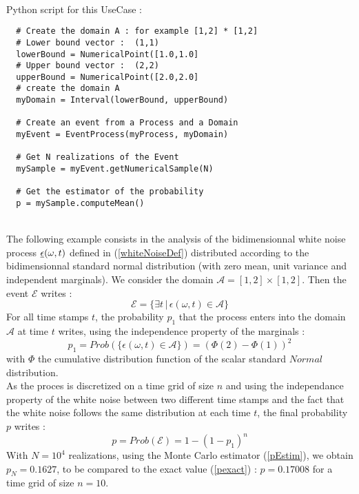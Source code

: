 \textspace\\
Python script for this UseCase :

\begin{lstlisting}
  # Create the domain A : for example [1,2] * [1,2]
  # Lower bound vector :  (1,1)
  lowerBound = NumericalPoint([1.0,1.0]
  # Upper bound vector :  (2,2)
  upperBound = NumericalPoint([2.0,2.0]
  # create the domain A 
  myDomain = Interval(lowerBound, upperBound)

  # Create an event from a Process and a Domain
  myEvent = EventProcess(myProcess, myDomain)

  # Get N realizations of the Event
  mySample = myEvent.getNumericalSample(N)
 
  # Get the estimator of the probability
  p = mySample.computeMean()

\end{lstlisting}

\textspace\\

The following  example consists in the analysis of the  bidimensionnal white noise process $ {\underline{\epsilon}}(\omega,t)$  defined in (\ref{whiteNoiseDef}) distributed according to the bidimensionnal standard normal distribution (with zero mean, unit variance  and independent marginals). We consider the domain  $\mathcal{A} =  [1,2] \times [1,2]$. Then the event $\mathcal{E}$ writes : 
$$
\mathcal{E} = \{ \exists t \, | \, \epsilon(\omega,t)  \in \mathcal{A} \}
$$
For all time stamps $t$, the probability $p_1$ that the process enters into the domain $\mathcal{A}$ at time $t$ writes, using the independence property of the marginals :
$$
p_1 = Prob(\{\epsilon(\omega,t)  \in \mathcal{A}\}) = (\Phi(2) - \Phi(1))^2
$$
with $\Phi$ the cumulative distribution function of the scalar standard $Normal$ distribution.\\
As the proces is discretized on a time grid of size $n$ and using the independance property of the white noise between two different time stamps and the fact that the white noise follows the same distribution at each time $t$, the final probability $p$  writes :
\begin{equation}\label{pexact}
p = Prob(\mathcal{E}) = 1 - (1 - p_1)^{n}
\end{equation}
With $N=10^4$ realizations, using the Monte Carlo estimator (\ref{pEstim}), we obtain $p_N = 0.1627$, to be compared to the exact value (\ref{pexact}) : $p=0.17008$ for a time grid of size $n=10$.
